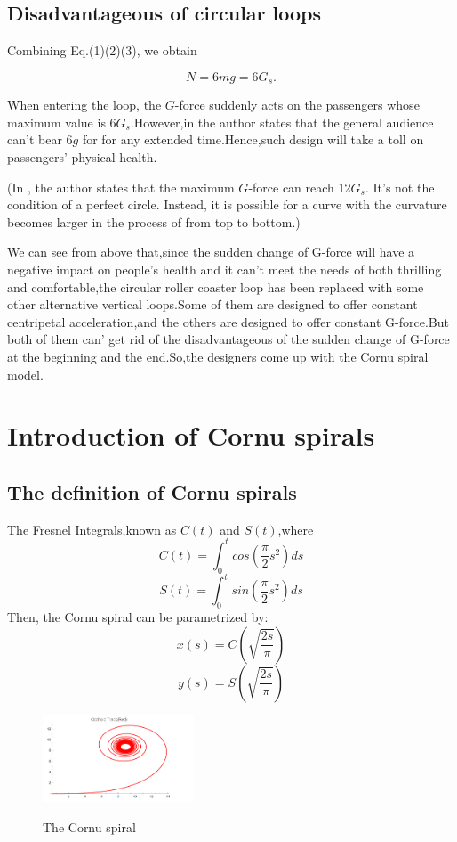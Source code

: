 \documentclass{article}
\begin{document}
\subsection{Disadvantageous of circular loops}
    Combining Eq.(1)(2)(3), we obtain

    $$
        N=6mg=6G_s.
    $$


    When entering the loop, the $G$-force suddenly acts on the passengers whose maximum value is $6G_s$.However,in \cite{ref4} the author states that the general audience can't bear $6g$ for for any extended time.Hence,such design will take a toll on passengers' physical health.

    (In \cite{ref1}, the author states that the maximum $G$-force can reach 12$G_s$. It's not the condition of a perfect circle. Instead, it is possible for a curve with the curvature becomes larger in the process of from top to bottom.)



\pagebreak


We can see from above that,since the sudden change of G-force will have a negative impact on people's health and it can't meet the needs of both thrilling and comfortable,the circular roller coaster loop has been replaced with some other alternative vertical loops.Some of them are designed to offer constant centripetal acceleration,and the others are designed to offer constant G-force.But both of them can' get rid of the disadvantageous of the sudden change of  G-force at the beginning and the end.So,the designers come up with the Cornu spiral model.\\
\section{Introduction of Cornu spirals }
\subsection{The definition of Cornu spirals}
The Fresnel Integrals,known as $C(t)$ and $S(t)$,where
$$
C(t)=\int_{0}^{t}cos(\frac{\pi}{2}s^2)ds
$$
$$
S(t)=\int_{0}^{t}sin(\frac{\pi}{2}s^2)ds
$$
Then, the Cornu spiral can be parametrized by:
$$
x(s)=C(\sqrt{\frac{2s}{\pi}})
$$
$$
y(s)=S(\sqrt{\frac{2s}{\pi}})
$$
\begin{figure}[H]
        \centering
        \includegraphics[width=0.4\textwidth]{clothoid.png}
        \label{1}
        \caption{The Cornu spiral}
    \end{figure}
\end{document}
